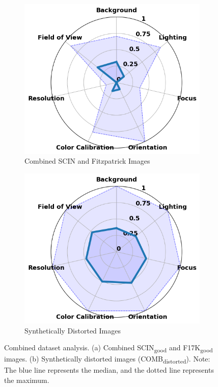 \begin{figure}[ht]
    \centering
    \begin{subfigure}[b]{0.45\textwidth}
        \includegraphics[width=\textwidth]{img/hept/combined.png}
        \caption{Combined SCIN and Fitzpatrick Images}
        \label{fig:combined}
    \end{subfigure}
    \hfill
    \begin{subfigure}[b]{0.45\textwidth}
        \includegraphics[width=\textwidth]{img/hept/comb_synthetic.png}
        \caption{Synthetically Distorted Images}
        \label{fig:comb_synthetic}
    \end{subfigure}
    \hfill
    \caption{Combined dataset analysis. (a) Combined SCIN\textsubscript{good} and F17K\textsubscript{good} images. (b) Synthetically distorted images (COMB\textsubscript{distorted}). Note: The blue line represents the median, and the dotted line represents the maximum.}
    \label{fig:CF}
\end{figure}

